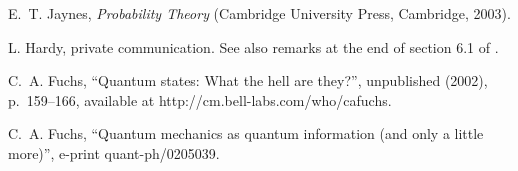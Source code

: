 \documentclass[pra,12pt,tightenlines]{revtex4-2}
\begin{document}
\begin{thebibliography}{10}
E.~T. Jaynes, {\em Probability Theory\/} 
(Cambridge University Press, Cambridge, 2003).

L. Hardy, private communication. See also remarks
at the end of section 6.1 of \cite{Hardy-0101}.

C.~A. Fuchs, ``Quantum states: What the hell are they?'', unpublished (2002), 
p.~159--166, available at http://cm.bell-labs.com/who/cafuchs.

C.~A. Fuchs, 
``Quantum mechanics as quantum information (and only a little more)'',
e-print quant-ph/0205039.

\end{thebibliography}
\end{document}
